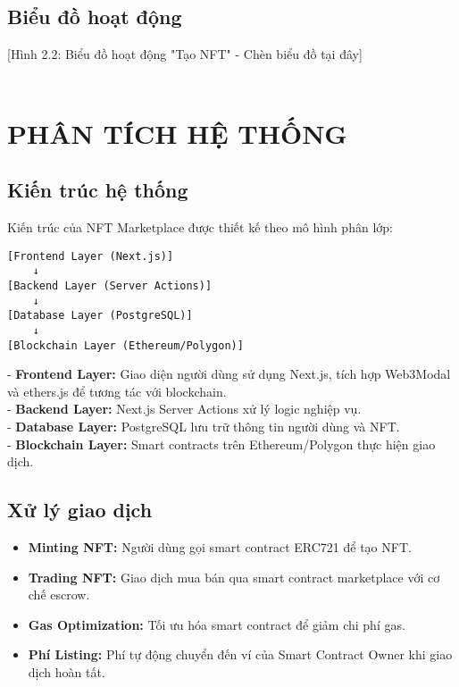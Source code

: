 \documentclass[a4paper,12pt]{report}
\begin{document}
\section{Biểu đồ hoạt động}
[Hình 2.2: Biểu đồ hoạt động "Tạo NFT" - Chèn biểu đồ tại đây] \\
[Hình 2.3: Biểu đồ hoạt động "Mua NFT" - Chèn biểu đồ tại đây] \\
[Hình 2.4: Biểu đồ hoạt động "Bán NFT" - Chèn biểu đồ tại đây]

\chapter{PHÂN TÍCH HỆ THỐNG}

\section{Kiến trúc hệ thống}
Kiến trúc của NFT Marketplace được thiết kế theo mô hình phân lớp:
\begin{verbatim}
[Frontend Layer (Next.js)]
    ↓
[Backend Layer (Server Actions)]
    ↓
[Database Layer (PostgreSQL)]
    ↓
[Blockchain Layer (Ethereum/Polygon)]
\end{verbatim}
- \textbf{Frontend Layer:} Giao diện người dùng sử dụng Next.js, tích hợp Web3Modal và ethers.js để tương tác với blockchain. \\
- \textbf{Backend Layer:} Next.js Server Actions xử lý logic nghiệp vụ. \\
- \textbf{Database Layer:} PostgreSQL lưu trữ thông tin người dùng và NFT. \\
- \textbf{Blockchain Layer:} Smart contracts trên Ethereum/Polygon thực hiện giao dịch.

\section{Xử lý giao dịch}
\begin{itemize}
    \item \textbf{Minting NFT:} Người dùng gọi smart contract ERC721 để tạo NFT.
    \item \textbf{Trading NFT:} Giao dịch mua bán qua smart contract marketplace với cơ chế escrow.
    \item \textbf{Gas Optimization:} Tối ưu hóa smart contract để giảm chi phí gas.
    \item \textbf{Phí Listing:} Phí tự động chuyển đến ví của Smart Contract Owner khi giao dịch hoàn tất.
\end{itemize}
\end{document}
